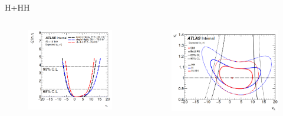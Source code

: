 \begin{frame}{H+HH }
\begin{columns}
\begin{figure}
    \centering
    \includegraphics[width=1\textwidth]{BackUp/Part3/Img/H_HH_combination.png}
\end{figure}

\begin{figure}
    \centering
    \includegraphics[width=1\textwidth]{BackUp/Part3/Img/H_HH_combination_kt_kl.png}
\end{figure}

\end{columns}
\end{frame}